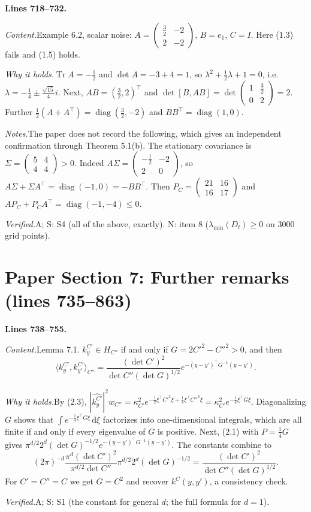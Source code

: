 \documentclass[11pt]{amsart}
\newcommand{\Tr}{\operatorname{Tr}}
\newcommand{\dd}{\,\mathrm{d}}
\newcommand{\ip}[2]{\langle #1,#2\rangle}
\newcommand{\hatf}[1]{\widehat{#1}}
\newcommand{\tp}{\top}
\newcommand{\src}[1]{\par\bigskip\noindent\textbf{Lines #1.}\enspace}
\newcommand{\content}{\par\smallskip\noindent\textit{Content.}\enspace}
\newcommand{\why}{\par\smallskip\noindent\textit{Why it holds.}\enspace}
\newcommand{\verified}{\par\smallskip\noindent\textit{Verified.}\enspace}
\newcommand{\notes}{\par\smallskip\noindent\textit{Notes.}\enspace}
\newcommand{\tA}{\textsf{A}}
\newcommand{\tS}{\textsf{S}}
\newcommand{\tN}{\textsf{N}}
\begin{document}
\src{718--732}
\content Example 6.2, scalar noise: $A=\begin{pmatrix}\frac32&-2\\2&-2\end{pmatrix}$, $B=e_1$, $C=I$. Here (1.3)
fails and (1.5) holds.
\why $\Tr A=-\frac12$ and $\det A=-3+4=1$, so $\lambda^2+\frac12\lambda+1=0$, i.e.\
$\lambda=-\frac14\pm\frac{\sqrt{15}}4i$. Next, $AB=(\frac32,2)^\tp$ and $\det[B,AB]=\det\begin{pmatrix}1&\frac32\\0&2
\end{pmatrix}=2$. Further $\frac12(A+A^\tp)=\operatorname{diag}(\frac32,-2)$ and $BB^\tp=\operatorname{diag}(1,0)$.
\notes The paper does not record the following, which gives an independent confirmation through Theorem 5.1(b). The
stationary covariance is $\Sigma=\begin{pmatrix}5&4\\4&4\end{pmatrix}>0$. Indeed
$A\Sigma=\begin{pmatrix}-\frac12&-2\\2&0\end{pmatrix}$, so $A\Sigma+\Sigma A^\tp=\operatorname{diag}(-1,0)=-BB^\tp$. Then
$P_C=\begin{pmatrix}21&16\\16&17\end{pmatrix}$ and $AP_C+P_CA^\tp=\operatorname{diag}(-1,-4)\le0$.
\verified \tA; \tS: S4 (all of the above, exactly). \tN: item 8 ($\lambda_{\min}(D_t)\ge0$ on 3000 grid points).

\section{Paper Section 7: Further remarks (lines 735--863)}\label{sec:remarks}

\src{738--755}
\content Lemma 7.1. $k^{C'}_y\in H_{C''}$ if and only if $G=2C'^2-C''^2>0$, and then
\[
\ip{k^{C'}_y}{k^{C'}_{y'}}_{C''}=\frac{(\det C')^2}{\det C''(\det G)^{1/2}}e^{-(y-y')^\tp G^{-1}(y-y')} .
\]
\why By (2.3), $|\hatf{k^{C'}_y}|^2w_{C''}=\kappa_{C'}^2e^{-\frac12\xi^\tp C'^2\xi+\frac14\xi^\tp C''^2\xi}
=\kappa_{C'}^2e^{-\frac14\xi^\tp G\xi}$. Diagonalizing $G$ shows that $\int e^{-\frac14\xi^\tp G\xi}\dd\xi$ factorizes
into one-dimensional integrals, which are all finite if and only if every eigenvalue of $G$ is positive. Next, (2.1)
with $P=\frac14G$ gives $\pi^{d/2}2^d(\det G)^{-1/2}e^{-(y-y')^\tp G^{-1}(y-y')}$. The constants combine to
\[
(2\pi)^{-d}\frac{\pi^d(\det C')^2}{\pi^{d/2}\det C''}\pi^{d/2}2^d(\det G)^{-1/2}
=\frac{(\det C')^2}{\det C''(\det G)^{1/2}} .
\]
For $C'=C''=C$ we get $G=C^2$ and recover $k^C(y,y')$, a consistency check.
\verified \tA; \tS: S1 (the constant for general $d$; the full formula for $d=1$).
\end{document}

